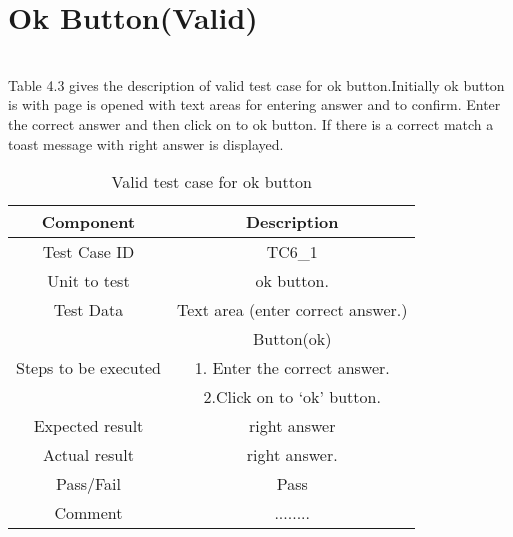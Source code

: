 \section{Ok Button(Valid)}
\hspace{1cm} \\
Table 4.3 gives the description of valid test case for ok button.Initially ok button is with page is opened with  text areas for entering answer and to confirm. Enter the correct answer and  then click on to ok button.  If there is a correct match a toast message with right answer is displayed.\\
\vspace{1cm}
\begin{table}[htb!]
\label{table : tc11}
\centering %
\begin{tabular}{c c} %
\hline\hline %
 Component & Description \\ [0.5ex] %
\hline %
Test Case ID & TC6\_1   \\
Unit to test &ok button. \\ 
Test Data &Text area (enter correct answer.)\\
&Button(ok)\\
Steps to be executed &1. Enter the correct answer.\\
&2.Click on to ‘ok’ button.\\
Expected result  &right answer\\ 
Actual result &right answer.\\
Pass/Fail &Pass\\
Comment &........\\

\hline %
\end{tabular}
\caption{Valid test case for ok button} \label{table:tc11} %
\end{table}

